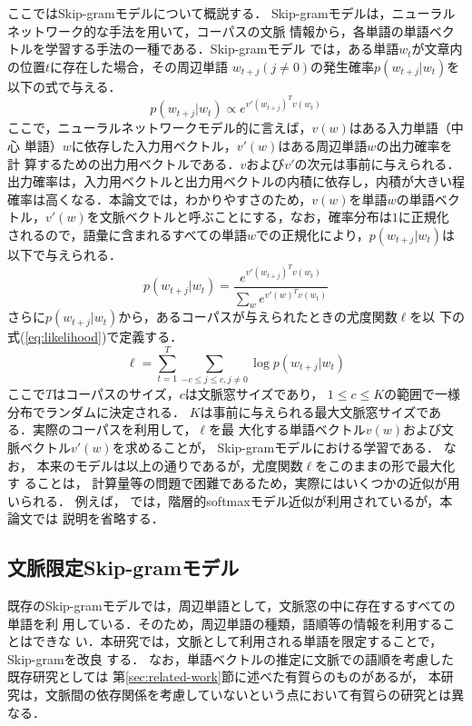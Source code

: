 \documentclass[japanese]{jnlp_1.4}
\begin{document}
ここではSkip-gramモデル\cite{mikolov1}について概説する．
Skip-gramモデルは，ニューラルネットワーク的な手法を用いて，コーパスの文脈
情報から，各単語の単語ベクトルを学習する手法の一種である．Skip-gramモデル
では，ある単語$w_t$が文章内の位置$t$に存在した場合，その周辺単語
$w_{t+j}(j\neq 0)$の発生確率$p(w_{t+j}|w_t)$を以下の式で与える．
\begin{equation}
  p(w_{t+j}|w_t) \propto e^{v'(w_{t+j})^T v(w_t)}
\end{equation}
ここで，ニューラルネットワークモデル的に言えば，$v(w)$はある入力単語（中心
単語）$w$に依存した入力用ベクトル，$v'(w)$はある周辺単語$w$の出力確率を計
算するための出力用ベクトルである．$v$および$v'$の次元は事前に与えられる．
出力確率は，入力用ベクトルと出力用ベクトルの内積に依存し，内積が大きい程
確率は高くなる．本論文では，わかりやすさのため，$v(w)$を単語$w$の単語ベク
トル，$v'(w)$を文脈ベクトルと呼ぶことにする，なお，確率分布は$1$に正規化
されるので，語彙に含まれるすべての単語$w$での正規化により，$p(w_{t+j}
|w_t)$は以下で与えられる．
\begin{equation}
  p(w_{t+j}|w_t )=\frac{ e^{v'(w_{t+j})^T v(w_t)} }{ \sum_w
  e^{v'(w)^T v(w_t)} }
\end{equation}
さらに$p(w_{t+j}|w_t)$から，あるコーパスが与えられたときの尤度関数$\ell$を以
下の式(\ref{eq:likelihood})で定義する．
\begin{equation}
  \ell=\sum_{t=1}^T \sum_{-c\leq j\leq c, j\neq 0} \log p(w_{t+j}|w_t) 
\label{eq:likelihood}
\end{equation}
ここで$T$はコーパスのサイズ，$c$は文脈窓サイズであり，
$1 \leq c \leq K$の範囲で一様分布でランダムに決定される．
$K$は事前に与えられる最大文脈窓サイズである．実際のコーパスを利用して，$\ell$を最
大化する単語ベクトル$v(w)$および文脈ベクトル$v'(w)$を求めることが，
Skip-gramモデルにおける学習である．
なお，
本来のモデルは以上の通りであるが，尤度関数$\ell$をこのままの形で最大化す
ることは，
計算量等の問題で困難であるため，実際にはいくつかの近似が用いられる．
例えば，
\cite{mikolov1}では，階層的softmaxモデル近似が利用されているが，本論文では
説明を省略する．



\subsection{文脈限定Skip-gramモデル}
\label{subsec:method:limited-skipgram}

既存のSkip-gramモデルでは，周辺単語として，文脈窓の中に存在するすべての単語を利
用している．そのため，周辺単語の種類，語順等の情報を利用することはできな
い．本研究では，文脈として利用される単語を限定することで，Skip-gramを改良
する．
なお，単語ベクトルの推定に文脈での語順を考慮した既存研究としては
第\ref{sec:related-work}節に述べた有賀ら\cite{ariga}のものがあるが，
本研究は，文脈間の依存関係を考慮していないという点において有賀らの研究とは異なる．
\end{document}
